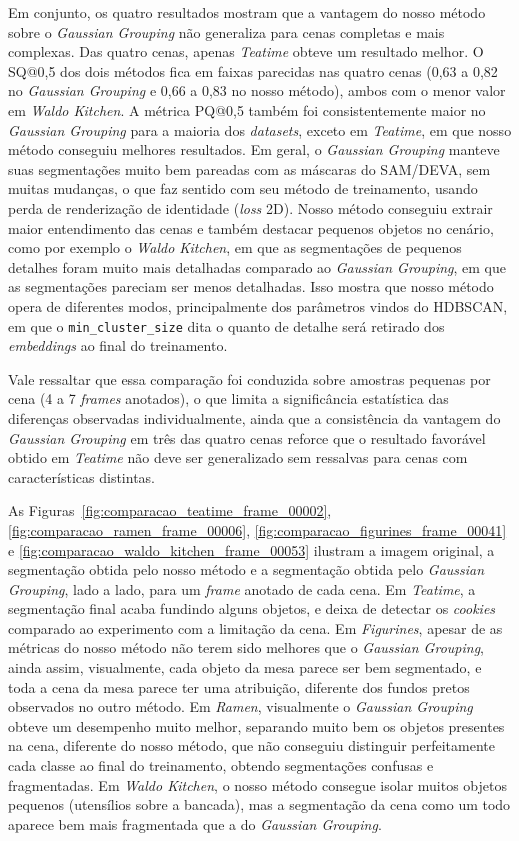 Em conjunto, os quatro resultados mostram que a vantagem do nosso método sobre o \textit{Gaussian Grouping} não generaliza para cenas completas e mais complexas. Das quatro cenas, apenas \textit{Teatime} obteve um resultado melhor. O SQ@0,5 dos dois métodos fica em faixas parecidas nas quatro cenas (0,63 a 0,82 no \textit{Gaussian Grouping} e 0,66 a 0,83 no nosso método), ambos com o menor valor em \textit{Waldo Kitchen}. A métrica PQ@0,5 também foi consistentemente maior no \textit{Gaussian Grouping} para a maioria dos \textit{datasets}, exceto em \textit{Teatime}, em que nosso método conseguiu melhores resultados. Em geral, o \textit{Gaussian Grouping} manteve suas segmentações muito bem pareadas com as máscaras do SAM/DEVA, sem muitas mudanças, o que faz sentido com seu método de treinamento, usando perda de renderização de identidade (\textit{loss} 2D). Nosso método conseguiu extrair maior entendimento das cenas e também destacar pequenos objetos no cenário, como por exemplo o \textit{Waldo Kitchen}, em que as segmentações de pequenos detalhes foram muito mais detalhadas comparado ao \textit{Gaussian Grouping}, em que as segmentações pareciam ser menos detalhadas. Isso mostra que nosso método opera de diferentes modos, principalmente dos parâmetros vindos do HDBSCAN, em que o \texttt{min\_cluster\_size} dita o quanto de detalhe será retirado dos \textit{embeddings} ao final do treinamento.


Vale ressaltar que essa comparação foi conduzida sobre amostras pequenas por cena (4 a 7 \textit{frames} anotados), o que limita a significância estatística das diferenças observadas individualmente, ainda que a consistência da vantagem do \textit{Gaussian Grouping} em três das quatro cenas reforce que o resultado favorável obtido em \textit{Teatime} não deve ser generalizado sem ressalvas para cenas com características distintas.


As Figuras~\ref{fig:comparacao_teatime_frame_00002}, \ref{fig:comparacao_ramen_frame_00006}, \ref{fig:comparacao_figurines_frame_00041} e \ref{fig:comparacao_waldo_kitchen_frame_00053} ilustram a imagem original, a segmentação obtida pelo nosso método e a segmentação obtida pelo \textit{Gaussian Grouping}, lado a lado, para um \textit{frame} anotado de cada cena. Em \textit{Teatime}, a segmentação final acaba fundindo alguns objetos, e deixa de detectar os \textit{cookies} comparado ao experimento com a limitação da cena. Em \textit{Figurines}, apesar de as métricas do nosso método não terem sido melhores que o \textit{Gaussian Grouping}, ainda assim, visualmente, cada objeto da mesa parece ser bem segmentado, e toda a cena da mesa parece ter uma atribuição, diferente dos fundos pretos observados no outro método. Em \textit{Ramen}, visualmente o \textit{Gaussian Grouping} obteve um desempenho muito melhor, separando muito bem os objetos presentes na cena, diferente do nosso método, que não conseguiu distinguir perfeitamente cada classe ao final do treinamento, obtendo segmentações confusas e fragmentadas. Em \textit{Waldo Kitchen}, o nosso método consegue isolar muitos objetos pequenos (utensílios sobre a bancada), mas a segmentação da cena como um todo aparece bem mais fragmentada que a do \textit{Gaussian Grouping}.


